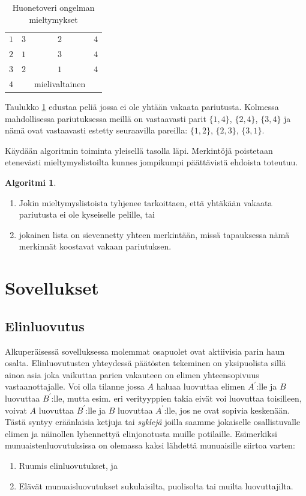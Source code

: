 \documentclass[finnish]{tktltiki2}
\theoremstyle{definition}
\newtheorem{alg}[lau]{Algoritmi}
\theoremstyle{remark}
\begin{document}
\begin{table}[H]\label{room-table}
\begin{center}
	\begin{tabular}{ l | *{2}{c} r }
	 &  \\
	 \hline
 	 $1$ & $3$ & $2$ & $4$ \\
 	 $2$ & $1$ & $3$ & $4$ \\
 	 $3$ & $2$ & $1$ & $4$ \\
 	 $4$ & &mielivaltainen
	\end{tabular}
	\caption{Huonetoveri ongelman mieltymykset \cite[s. 164]{gusfield1989stable}}
\end{center}
\end{table}

Taulukko \ref{room-table} edustaa peliä jossa ei ole yhtään vakaata pariutusta. Kolmessa mahdollisessa pariutuksessa meillä on vastaavasti parit $\{1,4\}$, $\{2,4\}$, $\{3,4\}$ ja nämä ovat vastaavasti estetty seuraavilla pareilla: $\{1,2\}$, $\{2,3\}$, $\{3,1\}$.

Käydään algoritmin toiminta yleisellä tasolla läpi. Merkintöjä poistetaan etenevästi mieltymyslistoilta kunnes jompikumpi päättävistä ehdoista toteutuu. \cite[p, 165]{gusfield1989stable}
\begin{alg}\label{srp1}
\begin{enumerate}
	\item Jokin mieltymyslistoista tyhjenee tarkoittaen, että yhtäkään vakaata pariutusta ei ole kyseiselle pelille, tai
	\item jokainen lista on sievennetty yhteen merkintään, missä tapauksessa nämä merkinnät koostavat vakaan pariutuksen.
\end{enumerate}
\end{alg}

\section{Sovellukset}
\subsection{Elinluovutus}
Alkuperäisessä sovelluksessa molemmat osapuolet ovat aktiivisia parin haun osalta. Elinluovutusten yhteydessä päätösten tekeminen on yksipuolista sillä ainoa asia joka vaikuttaa parien vakauteen on elimen yhteensopivuus vastaanottajalle. Voi olla tilanne jossa $A$ haluaa luovuttaa elimen $A^{'}$:lle ja $B$ luovuttaa $B^{'}$:lle, mutta esim. eri verityyppien takia eivät voi luovuttaa toisilleen, voivat $A$ luovuttaa $B^{'}$:lle ja $B$ luovuttaa $A^{'}$:lle, jos ne ovat sopivia keskenään. Tästä syntyy eräänlaisia ketjuja tai \emph{syklejä} joilla saamme jokaiselle osallistuvalle elimen ja näinollen lyhennettyä elinjonotusta muille potilaille.
Esimerkiksi munuaistenluovutuksissa on olemassa kaksi lähdettä munuaisille siirtoa varten:
\begin{enumerate}
	\item Ruumis elinluovutukset, ja
	\item Elävät munuaisluovutukset sukulaisilta, puolisolta tai muilta luovuttajilta. \cite[s. 6]{NBERw10002}
\end{enumerate}
\end{document}
